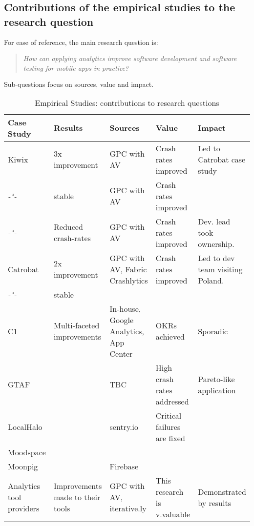 \subsection{Contributions of the empirical studies to the research question}
For ease of reference, the main research question is:
\begin{quote}
    \emph{How can applying analytics improve software development and software testing for mobile apps in practice?}    
\end{quote}
Sub-questions focus on sources, value and impact. 
\begin{landscape} %
\begin{table}
    \centering
    \tabcolsep=0.06cm
    \tiny
    \begin{tabular}{lllll}\toprule
    Case Study                  &Results                &Sources                &Value             &Impact  \\
    \midrule
    Kiwix                       &3x improvement         &GPC with AV            &Crash rates improved & Led to Catrobat case study \\ 
     \textit{-"-}               &stable                 &GPC with AV            &Crash rates improved &  \\
     \textit{-"-}               &Reduced crash-rates    &GPC with AV            &Crash rates improved & Dev. lead took ownership. \\
     \midrule
    Catrobat                    &2x improvement         &GPC with AV, Fabric Crashlytics &Crash rates improved &Led to dev team visiting Poland. \\
     \textit{-"-}               &stable                &   &                  & \\
     \midrule
    C1                          &Multi-faceted improvements &In-house, Google Analytics, App Center &OKRs achieved &Sporadic \\
    GTAF                        &                      &TBC &High crash rates addressed &Pareto-like application \\
    LocalHalo                   &                      &sentry.io &Critical failures are fixed & \\
    Moodspace                   &                      & & & \\
    Moonpig                     &                      &Firebase & & \\
    Analytics tool providers    &Improvements made to their tools &GPC with AV, iterative.ly  &This research is v.valuable &Demonstrated by results \\
    \bottomrule
    \end{tabular}
    \caption{Empirical Studies: contributions to research questions}
    \label{tab:empirical-studies-contributions-to-research-questions}
\end{table}
\end{landscape}